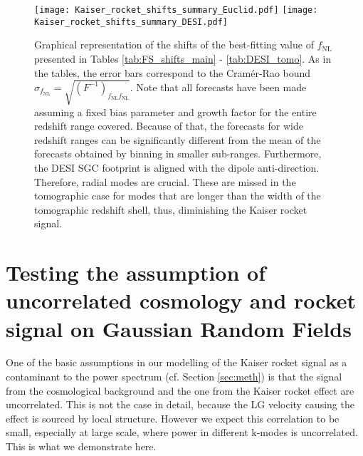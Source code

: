 \documentclass[a4paper,11pt]{article}
\begin{document}
\begin{figure}
    \centering
    \texttt{[image: Kaiser\_rocket\_shifts\_summary\_Euclid.pdf]}
    \texttt{[image: Kaiser\_rocket\_shifts\_summary\_DESI.pdf]}
    \caption{Graphical representation of the shifts of the best-fitting value of $f_\mathrm{NL}$ presented in Tables \ref{tab:FS_shifts_main} - \ref{tab:DESI_tomo}. As in the tables, the error bars correspond to the Cram\'er-Rao bound $\sigma_{f_\mathrm{NL}}=\sqrt{(F^{-1})_{f_\mathrm{NL}f_\mathrm{NL}}}$. Note that all forecasts have been made assuming a fixed bias parameter and growth factor for the entire redshift range covered. Because of that, the forecasts for wide redshift ranges can be significantly different from the mean of the forecasts obtained by binning in smaller sub-ranges. Furthermore, the DESI SGC footprint is aligned with the dipole anti-direction. Therefore, radial modes are crucial. These are missed in the tomographic case for modes that are longer than the width of the tomographic redshift shell, thus, diminishing the Kaiser rocket signal.}
    \label{fig:shift_summary}
\end{figure}


\section{Testing the assumption of uncorrelated  cosmology and rocket signal on Gaussian Random Fields}
\label{sec:GRF}
One of the basic assumptions in  our modelling of the Kaiser rocket signal as a contaminant to the power spectrum (cf. Section \ref{sec:meth}) is that the signal from the cosmological background and the one from the Kaiser rocket effect are uncorrelated.
This is not the case in detail, because the LG velocity  causing the effect is sourced by local structure. However we expect this correlation to be small, especially  at large scale,   where  power in different k-modes is uncorrelated.
This is what we demonstrate here.
\end{document}
